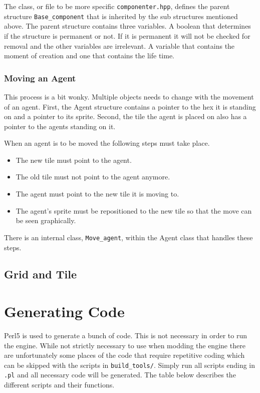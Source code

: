The class, or file to be more specific \verb|componenter.hpp|, defines the parent structure \verb|Base_component| that is inherited by the sub structures mentioned above. 
The parent structure contains three variables. A boolean that determines if the structure is permanent or not. If it is permanent it will not be checked for removal and the other variables are irrelevant.
A variable that contains the moment of creation and one that contains the life time. 

\subsubsection{Moving an Agent}
This process is a bit wonky. Multiple objects needs to change with the movement of an agent.
First, the Agent structure contains a pointer to the hex it is standing on and a pointer to its sprite.
Second, the tile the agent is placed on also has a pointer to the agents standing on it. 

When an agent is to be moved the following steps must take place.
\begin{itemize}
	\item The new tile must point to the agent.
	\item The old tile must not point to the agent anymore.
	\item The agent must point to the new tile it is moving to.
	\item The agent's sprite must be repositioned to the new tile so that the move can be seen graphically.
\end{itemize}

There is an internal class, \verb|Move_agent|, within the Agent class that handles these steps. 

\subsection{Grid and Tile}


\section{Generating Code} \label{generating code}
Perl5 is used to generate a bunch of code. This is not necessary in order to run the engine. 
While not strictly necessary to use when modding the engine there are unfortunately some places of the code that
require repetitive coding which can be skipped with the scripts in \verb|build_tools/|.
Simply run all scripts ending in \verb|.pl| and all necessary code will be generated. 
The table below describes the different scripts and their functions.

